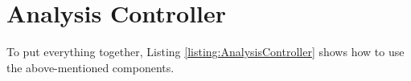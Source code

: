 		\setJavaCodeListing
		

	\section{Analysis Controller}

		To put everything together, Listing \ref{listing:AnalysisController} shows how to use the above-mentioned components.

		\setJavaCodeListing
		
